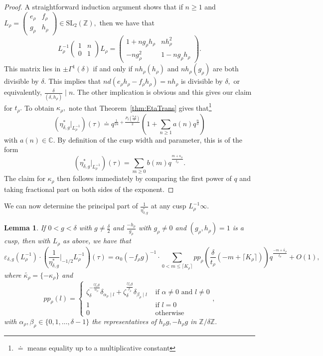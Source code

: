 \documentclass[10pt]{amsart}
\newtheorem{lemma}[theorem]{Lemma}
\theoremstyle{definition}
\theoremstyle{remark}
\numberwithin{equation}{section}
\newcommand{\C}{\mathbb C}
\newcommand{\SL}{\mathrm{SL}}
\newcommand{\Z}{\mathbb Z}
\begin{document}
	\begin{proof}
		A straightforward induction argument shows that if $n\geq 1$ and $L_\rho=\begin{pmatrix}
			e_\rho & f_\rho \\
			g_\rho & h_\rho
		\end{pmatrix}\in\SL_2(\Z),$ then we have that
	$$
	L_\rho^{-1}\begin{pmatrix}
		1 & n \\
		0 & 1
	\end{pmatrix}L_\rho = \begin{pmatrix}
		1+ng_\rho h_\rho  & nh_\rho^2 \\
		-ng_\rho^2 & 1-ng_\rho h_\rho
	\end{pmatrix}.
	$$
	This matrix lies in $\pm\Gamma^1(\delta)$ if and only if $nh_\rho(h_\rho)$ and $nh_\rho(g_\rho)$ are both divisible by $\delta.$ This implies that $nd(e_\rho h_\rho-f_\rho h_\rho)=nh_\rho$ is divisible by $\delta,$ or equivalently, $\frac{\delta}{(\delta,h_\rho)}\mid n.$ The other implication is obvious and this gives our claim for $t_\rho.$ To obtain $\kappa_\rho,$ note that Theorem~\ref{thm:EtaTrans} gives that\footnote{$\doteq$ means equality up to a multiplicative constant} 
	$$
	\left(\eta_{\delta,g}^\ast|_{L_\rho^{-1}}\right)(\tau) \doteq q^{\frac{1}{24}+\frac{P_2\left(\frac{h_\rho g}{\delta}\right)}{2}}\left(1+\sum\limits_{n\geq 1}a(n)q^{\frac{n}{\delta}} \right)
	$$
	with $a(n)\in\C.$ By definition of the cusp width and parameter, this is of the form
	$$
	\left(\eta_{\delta,g}^\ast|_{L_\rho^{-1}}\right)(\tau)=\sum\limits_{m\geq 0}b(m)q^{\frac{m+\kappa_\rho}{t_\rho}}.
	$$
	The claim for $\kappa_\rho$ then follows immediately by comparing the first power of $q$ and taking fractional part on both sides of the exponent.
	\end{proof}
	
	We can now determine the principal part of $\frac{1}{\eta_{\delta,g}^\ast}$ at any cusp $L_\rho^{-1}\infty.$
	
		\begin{lemma}\label{lem:princPartComp}
		If $0<g<\delta$ with $g\neq\frac{\delta}{2}$ and $\frac{-h_\rho}{g_\rho}$ with $g_\rho\neq 0$ and $(g_\rho,h_\rho)=1$ is a cusp, then with $L_\rho$ as above, we have that
		$$
		\varepsilon_{\delta,g}(L_\rho^{-1})\cdot \left(\frac{1}{\eta_{\delta,g}^\ast}\Bigg|_{-1/2}{L_\rho^{-1}}\right)(\tau) = \alpha_0(-f_\rho g)^{-1}\cdot \sum\limits_{0<m\leq \lceil K_\rho\rceil } pp_\rho\left(\frac{\delta}{t_\rho}\left(-m+\lceil K_\rho\rceil\right)\right)q^{\frac{-m+\widetilde{\kappa_\rho}}{t_\rho}} + O(1),
		$$
		where $\widetilde{\kappa_\rho}=\{-\kappa_\rho\}$ and 
		$$
		pp_\rho(l) = \begin{cases}
			\zeta_{\delta}^{-\frac{lf_\rho g}{\alpha_\rho}}\delta_{\alpha_\rho\mid l}+\zeta_{\delta}^{\frac{lf_\rho g}{\beta_\rho}}\delta_{\beta_\rho\mid l} & \text{ if }\alpha\neq 0\text{ and }l\neq 0 \\
			1 & \text{ if }l = 0 \\
			0 & \text{ otherwise} 
		\end{cases},
		$$
		with $\alpha_\rho,\beta_\rho\in\{0,1,\ldots,\delta-1\}$ the representatives of $h_\rho g,-h_\rho g$ in $\Z/\delta\Z.$ 
	\end{lemma}
	
\end{document}
